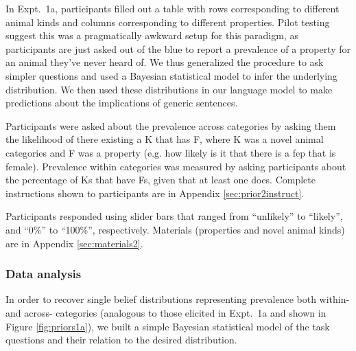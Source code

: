 \documentclass[10pt,letterpaper]{article}
\begin{document}
In Expt.~1a, participants filled out a table with rows corresponding to different animal kinds and columns corresponding to different properties. 
Pilot testing suggest this was a pragmatically awkward setup for this paradigm, as participants are just asked out of the blue to report a prevalence of a property for an animal they've never heard of. 
We thus generalized the procedure to ask simpler questions and used a Bayesian statistical model to infer the underlying distribution. 
We then used these distributions in our language model to make predictions about the implications of generic sentences.


Participants were asked about the prevalence across categories by asking them the likelihood of there existing a K that has F, where K was a novel animal categories and F was a property (e.g. how likely is it that there is a fep that is female). 
Prevalence within categories was measured by asking participants about the percentage of Ks that have Fs, given that at least one does.
Complete instructions shown to participants are in Appendix \ref{sec:prior2instruct}. 

Participants responded using slider bars that ranged from ``unlikely'' to ``likely'', and ``0\%'' to ``100\%'', respectively.
Materials (properties and novel animal kinds) are in Appendix \ref{sec:materials2}.

\subsubsection{Data analysis}

In order to recover single belief distributions representing prevalence both within- and across- categories (analogous to those elicited in Expt.~1a and shown in Figure \ref{fig:priors1a}), we built a simple Bayesian statistical model of the task questions and their relation to the desired distribution. 
\end{document}
